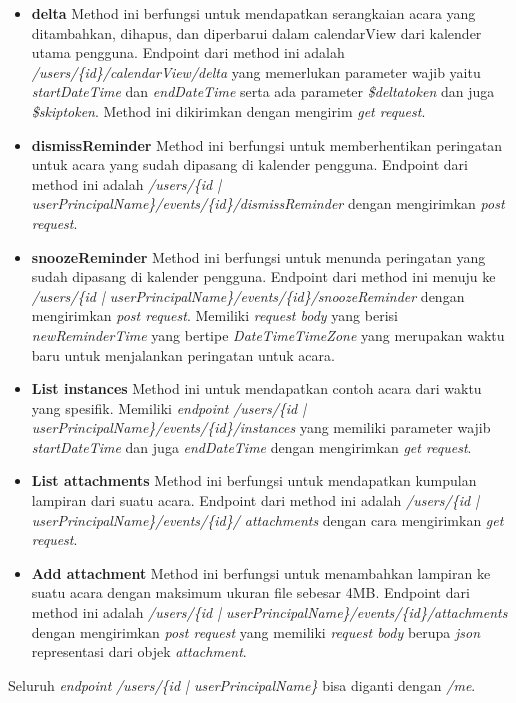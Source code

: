 \begin{itemize}
	\item \textbf{delta}
	Method ini berfungsi untuk mendapatkan serangkaian acara yang ditambahkan, dihapus, dan diperbarui dalam calendarView dari kalender utama pengguna. Endpoint dari method ini adalah \textit{/users/\{id\}/calendarView/delta} yang memerlukan parameter wajib yaitu \textit{startDateTime} dan \textit{endDateTime} serta ada parameter \textit{\$deltatoken} dan juga \textit{\$skiptoken}. Method ini dikirimkan dengan mengirim \textit{get request}.  
	\item \textbf{dismissReminder}
	Method ini berfungsi untuk memberhentikan peringatan untuk acara yang sudah dipasang di kalender pengguna. Endpoint dari method ini adalah \textit{/users/\{id | userPrincipalName\}/events/\{id\}/dismissReminder} dengan mengirimkan \textit{post request}. 
	\item \textbf{snoozeReminder}
	Method ini berfungsi untuk menunda peringatan yang sudah dipasang di kalender pengguna. Endpoint dari method ini menuju ke \textit{/users/\{id | userPrincipalName\}/events/\{id\}/snoozeReminder} dengan mengirimkan \textit{post request}. Memiliki \textit{request body} yang berisi \textit{newReminderTime} yang bertipe \textit{DateTimeTimeZone} yang merupakan waktu baru untuk menjalankan peringatan untuk acara.  
	\item \textbf{List instances}
	Method ini untuk mendapatkan contoh acara dari waktu yang spesifik. Memiliki \textit{endpoint} \textit{/users/\{id | userPrincipalName\}/events/\{id\}/instances} yang memiliki parameter wajib \textit{startDateTime} dan juga \textit{endDateTime} dengan mengirimkan \textit{get request}. 
	\item \textbf{List attachments}
	Method ini berfungsi untuk mendapatkan kumpulan lampiran dari suatu acara. Endpoint dari method ini adalah \textit{/users\textit{/\{}id | userPrincipalName\}/events/\{id\}/ attachments} dengan cara mengirimkan \textit{get request}. 
	\item \textbf{Add attachment}
	Method ini berfungsi untuk menambahkan lampiran ke suatu acara dengan maksimum ukuran file sebesar 4MB. Endpoint dari method ini adalah \textit{/users/\{id | userPrincipalName\}/events/\{id\}/attachments} dengan mengirimkan \textit{post request} yang memiliki \textit{request body} berupa \textit{json} representasi dari objek \textit{attachment}. 
\end{itemize}

Seluruh \textit{endpoint} \textit{/users/\{id | userPrincipalName\}} bisa diganti dengan \textit{/me}. 

